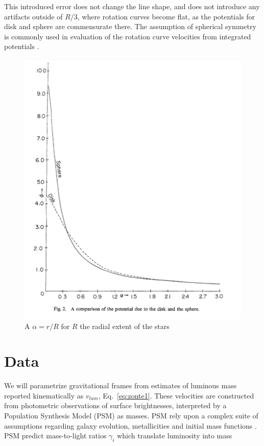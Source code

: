 \documentclass[reprint,%
 amsmath,amssymb,
 aps,
]{revtex4-1}
\begin{document}
This introduced error does not change  the line shape, and   does not introduce any artifacts outside of $R/3$, where rotation curves become flat,  as the potentials for disk and sphere are commensurate there. The assumption of spherical symmetry is commonly used   in evaluation of the   rotation curve velocities from integrated potentials \cite{2022A&A...664A..40M,PhysRevD.70.083509}. 
 
\begin{figure}
    \centering
     \includegraphics[width=\linewidth]{Chatterjee_SphereDisk.png}
    \caption{A $\alpha = r/R$ for $R$ the radial extent of the stars \cite{Chatterjee}}
    \label{fig:my_geom}
\end{figure}

  
  
\section{Data \label{sec:data}}
%  

We will parametrize gravitational frames from estimates of luminous mass reported kinematically as  $v_{lum}$, Eq.~\ref{eq:zonte1}. These velocities  are constructed from photometric observations of surface brightnesses, interpreted   by a Population Synthesis Model (PSM)\cite{10.1093/mnras/sty3223} as     masses. 
PSM rely upon a complex  suite of  assumptions regarding galaxy evolution, metallicities and initial mass functions  \cite{BelldYong,10.1093/mnras/sty3223}. PSM predict   mass-to-light ratios  $\gamma_i$
 which translate  luminosity into mass
 
\end{document}

